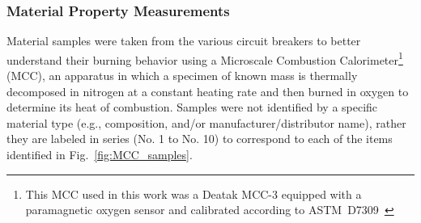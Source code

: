 \subsubsection{Material Property Measurements}
\label{ssec:MCC}

Material samples were taken from the various circuit breakers to better understand their burning behavior using a Microscale Combustion Calorimeter\footnote{This MCC used in this work was a Deatak MCC-3 equipped with a paramagnetic oxygen sensor and calibrated according to ASTM~D7309~\cite{ASTMD7309}} (MCC), an apparatus in which a specimen of known mass is thermally decomposed in nitrogen at a constant heating rate and then burned in oxygen to determine its heat of combustion. Samples were not identified by a specific material type (e.g., composition, and/or manufacturer/distributor name), rather they are labeled in series (No. 1 to No. 10) to correspond to each of the items identified in Fig.~\ref{fig:MCC_samples}.


